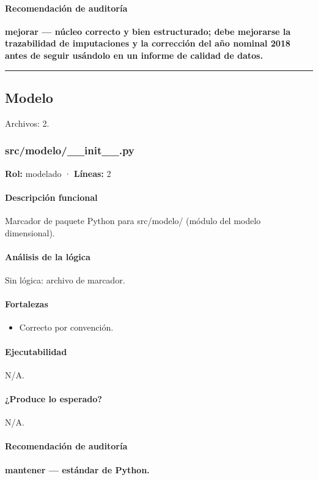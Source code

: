 \paragraph{Recomendación de auditoría}
\textbf{mejorar --- núcleo correcto y bien estructurado; debe mejorarse la trazabilidad de imputaciones y la corrección del año nominal 2018 antes de seguir usándolo en un informe de calidad de datos.}

\medskip
\hrule

\subsection{Modelo}
\noindent Archivos: 2.

\subsubsection{src/modelo/\_\_init\_\_.py}
\textbf{Rol:} modelado · \textbf{Líneas:} 2

\paragraph{Descripción funcional}
Marcador de paquete Python para src/modelo/ (módulo del modelo dimensional).

\paragraph{Análisis de la lógica}
Sin lógica: archivo de marcador.

\paragraph{Fortalezas}
\begin{itemize}
  \item Correcto por convención.
\end{itemize}

\paragraph{Ejecutabilidad}
N/A.

\paragraph{¿Produce lo esperado?}
N/A.

\paragraph{Recomendación de auditoría}
\textbf{mantener --- estándar de Python.}

